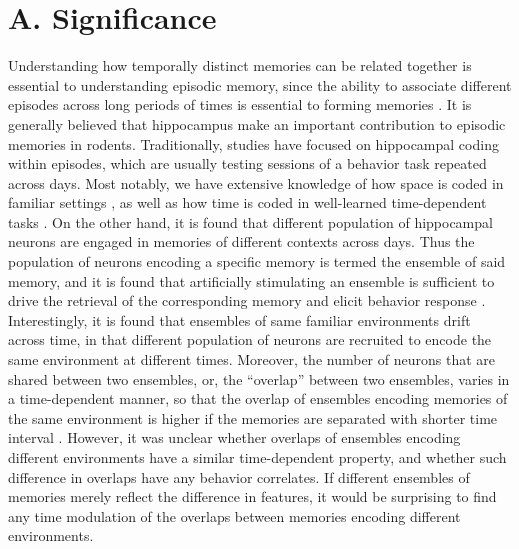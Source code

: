 \documentclass[master.tex]{subfiles}
\begin{document}
\section*{A. Significance}

Understanding how temporally distinct memories can be related together is
essential to understanding episodic memory, since the ability to associate
different episodes across long periods of times is essential to forming memories
\cite{eichenbaum_hippocampus_1999}. It is generally believed that hippocampus
make an important contribution to episodic memories in rodents. Traditionally,
studies have focused on hippocampal coding within episodes, which are usually
testing sessions of a behavior task repeated across days. Most notably, we have
extensive knowledge of how space is coded in familiar settings
\cite{hartley_space_2014}, as well as how time is coded in well-learned
time-dependent tasks \cite{eichenbaum_time_2014}. On the other hand, it is found
that different population of hippocampal neurons are engaged in memories of
different contexts across days. Thus the population of neurons encoding a
specific memory is termed the ensemble of said memory, and it is found that
artificially stimulating an ensemble is sufficient to drive the retrieval of the
corresponding memory and elicit behavior response \cite{ramirez_creating_2013}.
Interestingly, it is found that ensembles of same familiar environments drift
across time, in that different population of neurons are recruited to encode the
same environment at different times. Moreover, the number of neurons that are
shared between two ensembles, or, the ``overlap'' between two ensembles, varies
in a time-dependent manner, so that the overlap of ensembles encoding memories
of the same environment is higher if the memories are separated with shorter
time interval \cite{rubin_hippocampal_2015}. However, it was unclear whether
overlaps of ensembles encoding different environments have a similar
time-dependent property, and whether such difference in overlaps have any
behavior correlates. If different ensembles of memories merely reflect the
difference in features, it would be surprising to find any time modulation of
the overlaps between memories encoding different environments.
\end{document}
